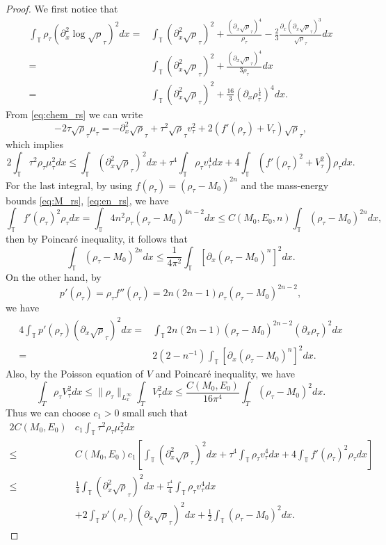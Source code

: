 \documentclass[leqno]{amsart}
\theoremstyle{plain}
\theoremstyle{definition}
\theoremstyle{remark}
\theoremstyle{plain}
\theoremstyle{plain}
\def\T{{\mathbb T}}%
\def\d{{\partial}}
\numberwithin{equation}{section}
\begin{document}
\begin{proof}
We first notice that
\begin{equation}\label{eq:H^2bd}
\begin{aligned}
\int_\T\rho_\tau(\d_x^2\log\sqrt\rho_\tau)^2 dx=&\int_\T(\d_x^2\sqrt\rho_\tau)^2+\frac{(\d_x\sqrt\rho_\tau)^4}{\rho_\tau}-\frac23\frac{\d_x(\d_x\sqrt\rho_\tau)^3}{\sqrt\rho_\tau} dx\\
=&\int_\T(\d_x^2\sqrt\rho_\tau)^2+\frac{(\d_x\sqrt\rho_\tau)^4}{3\rho_\tau}dx\\
=&\int_\T(\d_x^2\sqrt\rho_\tau)^2+\frac{16}{3}(\d_x\rho_\tau^{\frac14})^4dx.
\end{aligned}
\end{equation}
From \eqref{eq:chem_rs} we can write
\[
-2\tau\sqrt\rho_\tau\mu_\tau=-\d_x^2\sqrt\rho_\tau+\tau^2\sqrt\rho_\tau v^2_\tau+2(f'(\rho_\tau)+V_\tau)\sqrt\rho_\tau,
\]
which implies
\[
2\int_\T \tau^2\rho_\tau\mu_\tau^2 dx\leq \int_\T(\d_x^2\sqrt\rho_\tau)^2dx+\tau^4\int_\T \rho_\tau v^4_\tau dx+4\int_\T (f'(\rho_\tau)^2+V_\tau^2)\rho_\tau dx.
\]
For the last integral, by using $f(\rho_\tau)=(\rho_\tau-M_0)^{2n}$ and the mass-energy bounds \eqref{eq:M_rs}, \eqref{eq:en_rs}, we have
\[
\int_\T f'(\rho_\tau)^2\rho_\tau dx=\int_\T 4n^2\rho_\tau(\rho_\tau-M_0)^{4n-2} dx\leq C(M_0,E_0,n) \int_\T (\rho_\tau-M_0)^{2n} dx,
\]
then by Poincar\'e inequality, it follows that
\[
\int_\T (\rho_\tau-M_0)^{2n} dx\leq \frac{1}{4\pi^2}\int_\T[\d_x(\rho_\tau-M_0)^n]^2dx.
\]
On the other hand, by 
\[
p'(\rho_\tau)=\rho_\tau f''(\rho_\tau)=2n(2n-1)\rho_\tau(\rho_\tau-M_0)^{2n-2},
\]
we have
\begin{align*}
4\int_\T p'(\rho_\tau)(\d_x\sqrt\rho_\tau)^2dx=&\int_\T 2n(2n-1)(\rho_\tau-M_0)^{2n-2}(\d_x\rho_\tau)^2dx\\
=&2(2-n^{-1})\int_\T[\d_x(\rho_\tau-M_0)^n]^2dx.
\end{align*}
Also, by the Poisson equation of $V$ and Poincar\'e inequality, we have
\[
\int_T\rho_\tau V_\tau^2dx\leq \|\rho_\tau\|_{L^\infty_x}\int_T V_\tau^2dx\leq \frac{C(M_0,E_0)}{16\pi^4}\int_T (\rho_\tau-M_0)^2dx.
\]
Thus we can choose $c_1>0$ small such that
\begin{align*}
2C(M_0,E_0)&c_1 \int_\T\tau^2\rho_\tau\mu_\tau^2 dx\\
\leq & C(M_0,E_0)c_1\left[\int_\T(\d_x^2\sqrt\rho_\tau)^2dx+\tau^4\int_\T \rho_\tau v^4_\tau dx+4\int_\T f'(\rho_\tau)^2\rho_\tau dx\right]\\
\leq& \frac14\int_\T(\d_x^2\sqrt\rho_\tau)^2dx+\frac{\tau^4}{4}\int_\T \rho_\tau v^4_\tau dx\\
&+2\int_\T p'(\rho_\tau)(\d_x\sqrt\rho_\tau)^2dx+\frac12\int_\T(\rho_\tau-M_0)^2dx.

\end{align*}
\end{proof}
\end{document}

